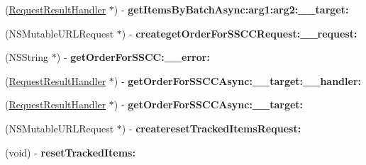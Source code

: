 \begin{DoxyCompactItemize}
\item 
\hypertarget{interface_supply_chain_service_port_binding_a60af9dfabe01d0860edb1fa4db07ecd9}{}(\hyperlink{interface_request_result_handler}{Request\+Result\+Handler} $\ast$) -\/ {\bfseries get\+Items\+By\+Batch\+Async\+:arg1\+:arg2\+:\+\_\+\+\_\+target\+:}\label{interface_supply_chain_service_port_binding_a60af9dfabe01d0860edb1fa4db07ecd9}

\item 
\hypertarget{interface_supply_chain_service_port_binding_a9e61e16a38db683a4c6aa4338041bc90}{}(N\+S\+Mutable\+U\+R\+L\+Request $\ast$) -\/ {\bfseries createget\+Order\+For\+S\+S\+C\+C\+Request\+:\+\_\+\+\_\+request\+:}\label{interface_supply_chain_service_port_binding_a9e61e16a38db683a4c6aa4338041bc90}

\item 
\hypertarget{interface_supply_chain_service_port_binding_ab1a5d006c979e83562b1883211eaf9f1}{}(N\+S\+String $\ast$) -\/ {\bfseries get\+Order\+For\+S\+S\+C\+C\+:\+\_\+\+\_\+error\+:}\label{interface_supply_chain_service_port_binding_ab1a5d006c979e83562b1883211eaf9f1}

\item 
\hypertarget{interface_supply_chain_service_port_binding_a33c4290cb863960ec4dffc41c47f5bb6}{}(\hyperlink{interface_request_result_handler}{Request\+Result\+Handler} $\ast$) -\/ {\bfseries get\+Order\+For\+S\+S\+C\+C\+Async\+:\+\_\+\+\_\+target\+:\+\_\+\+\_\+handler\+:}\label{interface_supply_chain_service_port_binding_a33c4290cb863960ec4dffc41c47f5bb6}

\item 
\hypertarget{interface_supply_chain_service_port_binding_a4002808d5327eda8c8ebe1688ae079f2}{}(\hyperlink{interface_request_result_handler}{Request\+Result\+Handler} $\ast$) -\/ {\bfseries get\+Order\+For\+S\+S\+C\+C\+Async\+:\+\_\+\+\_\+target\+:}\label{interface_supply_chain_service_port_binding_a4002808d5327eda8c8ebe1688ae079f2}

\item 
\hypertarget{interface_supply_chain_service_port_binding_a7a3b240150c8f02b3f01c51199048765}{}(N\+S\+Mutable\+U\+R\+L\+Request $\ast$) -\/ {\bfseries createreset\+Tracked\+Items\+Request\+:}\label{interface_supply_chain_service_port_binding_a7a3b240150c8f02b3f01c51199048765}

\item 
\hypertarget{interface_supply_chain_service_port_binding_a269d9f61f49710414891d45cdcab32df}{}(void) -\/ {\bfseries reset\+Tracked\+Items\+:}\label{interface_supply_chain_service_port_binding_a269d9f61f49710414891d45cdcab32df}


\end{DoxyCompactItemize}
